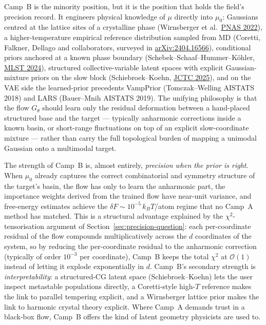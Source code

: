 \documentclass[11pt,letterpaper]{article}
\theoremstyle{plain}
\begin{document}
Camp~B is the minority position, but it is the position that holds the
field's precision record. It engineers physical knowledge of $\mu$
directly into $\mu_0$: Gaussians centred at the lattice sites of a
crystalline phase (Wirnsberger et al.\
\href{https://www.pnas.org/doi/10.1073/pnas.2202397119}{PNAS 2022}), a
higher-temperature empirical reference distribution sampled from MD
(Coretti, Falkner, Dellago and collaborators, surveyed in
\href{https://arxiv.org/abs/2404.16566}{arXiv:2404.16566}), conditional
priors anchored at a known phase boundary (Schebek--Schaaf--Hummer--Köhler,
\href{https://arxiv.org/abs/2406.12378}{MLST 2024}), structured
collective-variable latent spaces with explicit Gaussian-mixture priors on
the slow block (Schiebroek--Koehn,
\href{https://arxiv.org/abs/2504.20940}{JCTC 2025}), and on the VAE side
the learned-prior precedents VampPrior (Tomczak--Welling AISTATS 2018) and
LARS (Bauer--Mnih AISTATS 2019). The unifying philosophy is that the
flow $G_\theta$ should learn only the residual deformation between a
hand-placed structured base and the target --- typically anharmonic
corrections inside a known basin, or short-range fluctuations on top of an
explicit slow-coordinate mixture --- rather than carry the full topological
burden of mapping a unimodal Gaussian onto a multimodal target.

The strength of Camp~B is, almost entirely, \emph{precision when the prior
is right}. When $\mu_0$ already captures the correct combinatorial and
symmetry structure of the target's basin, the flow has only to learn the
anharmonic part, the importance weights derived from the trained flow have
near-unit variance, and free-energy estimates achieve the
$\delta F\sim 10^{-5}\,k_BT$/atom regime that no Camp~A method has matched.
This is a structural advantage explained by the
$\chi^2$-tensorisation argument of Section~\ref{sec:precision-question}:
each per-coordinate residual of the flow compounds multiplicatively across
the $d$ coordinates of the system, so by reducing the per-coordinate residual
to the anharmonic correction (typically of order $10^{-3}$ per coordinate),
Camp~B keeps the total $\chi^2$ at $\mathcal{O}(1)$ instead of letting it
explode exponentially in $d$. Camp~B's secondary strength is
\emph{interpretability}: a structured-CG latent space (Schiebroek--Koehn) lets
the user inspect metastable populations directly, a Coretti-style high-$T$
reference makes the link to parallel tempering explicit, and a Wirnsberger
lattice prior makes the link to harmonic crystal theory explicit. Where
Camp~A demands trust in a black-box flow, Camp~B offers the kind of latent
geometry physicists are used to.
\end{document}
